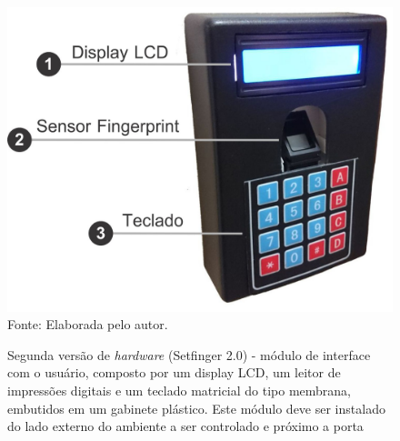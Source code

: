 \begin{figure}[!ht]
  \begin{center}
  \caption{Segunda versão de \textit{hardware} (Setfinger 2.0) - módulo de interface com o usuário, composto por um display LCD, um leitor de impressões digitais e um teclado matricial do tipo membrana, embutidos em um gabinete plástico. Este módulo deve ser instalado do lado externo do ambiente a ser controlado e próximo a porta}
  \includegraphics[scale=0.2]{figuras/cap4/setfinger_v2.jpg}\\
  Fonte: Elaborada pelo autor.
  \label{setfinger_v2}
  \end{center}
  \end{figure}

